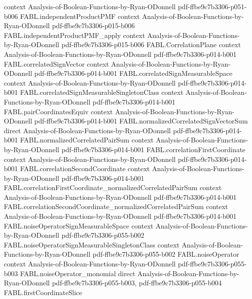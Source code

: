 \begin{theorem}
  {context}
  {Analysis-of-Boolean-Functions-by-Ryan-ODonnell}
  {pdf-ffbe9c7b3306-p051-b006}
\proofstep
  {FABL.independentProductPMF}
  {context}
  {Analysis-of-Boolean-Functions-by-Ryan-ODonnell}
  {pdf-ffbe9c7b3306-p015-b006}
\proofstep
  {FABL.independentProductPMF_apply}
  {context}
  {Analysis-of-Boolean-Functions-by-Ryan-ODonnell}
  {pdf-ffbe9c7b3306-p015-b006}
\proofstep
  {FABL.CorrelationPlane}
  {context}
  {Analysis-of-Boolean-Functions-by-Ryan-ODonnell}
  {pdf-ffbe9c7b3306-p014-b001}
\proofstep
  {FABL.correlatedSignVector}
  {context}
  {Analysis-of-Boolean-Functions-by-Ryan-ODonnell}
  {pdf-ffbe9c7b3306-p014-b001}
\proofstep
  {FABL.correlatedSignMeasurableSpace}
  {context}
  {Analysis-of-Boolean-Functions-by-Ryan-ODonnell}
  {pdf-ffbe9c7b3306-p014-b001}
\proofstep
  {FABL.correlatedSignMeasurableSingletonClass}
  {context}
  {Analysis-of-Boolean-Functions-by-Ryan-ODonnell}
  {pdf-ffbe9c7b3306-p014-b001}
\proofstep
  {FABL.pairCoordinatesEquiv}
  {context}
  {Analysis-of-Boolean-Functions-by-Ryan-ODonnell}
  {pdf-ffbe9c7b3306-p014-b001}
\proofstep
  {FABL.normalizedCorrelatedSignVectorSum}
  {direct}
  {Analysis-of-Boolean-Functions-by-Ryan-ODonnell}
  {pdf-ffbe9c7b3306-p014-b001}
\proofstep
  {FABL.normalizedCorrelatedPairSum}
  {context}
  {Analysis-of-Boolean-Functions-by-Ryan-ODonnell}
  {pdf-ffbe9c7b3306-p014-b001}
\proofstep
  {FABL.correlationFirstCoordinate}
  {context}
  {Analysis-of-Boolean-Functions-by-Ryan-ODonnell}
  {pdf-ffbe9c7b3306-p014-b001}
\proofstep
  {FABL.correlationSecondCoordinate}
  {context}
  {Analysis-of-Boolean-Functions-by-Ryan-ODonnell}
  {pdf-ffbe9c7b3306-p014-b001}
\proofstep
  {FABL.correlationFirstCoordinate_normalizedCorrelatedPairSum}
  {context}
  {Analysis-of-Boolean-Functions-by-Ryan-ODonnell}
  {pdf-ffbe9c7b3306-p014-b001}
\proofstep
  {FABL.correlationSecondCoordinate_normalizedCorrelatedPairSum}
  {context}
  {Analysis-of-Boolean-Functions-by-Ryan-ODonnell}
  {pdf-ffbe9c7b3306-p014-b001}
\proofstep
  {FABL.noiseOperatorSignMeasurableSpace}
  {context}
  {Analysis-of-Boolean-Functions-by-Ryan-ODonnell}
  {pdf-ffbe9c7b3306-p055-b002}
\proofstep
  {FABL.noiseOperatorSignMeasurableSingletonClass}
  {context}
  {Analysis-of-Boolean-Functions-by-Ryan-ODonnell}
  {pdf-ffbe9c7b3306-p055-b002}
\proofstep
  {FABL.noiseOperator}
  {context}
  {Analysis-of-Boolean-Functions-by-Ryan-ODonnell}
  {pdf-ffbe9c7b3306-p055-b003}
\proofstep
  {FABL.noiseOperator_monomial}
  {direct}
  {Analysis-of-Boolean-Functions-by-Ryan-ODonnell}
  {pdf-ffbe9c7b3306-p055-b003,
    pdf-ffbe9c7b3306-p055-b004}
\proofstep
  {FABL.firstCoordinateSlice}

\end{theorem}
